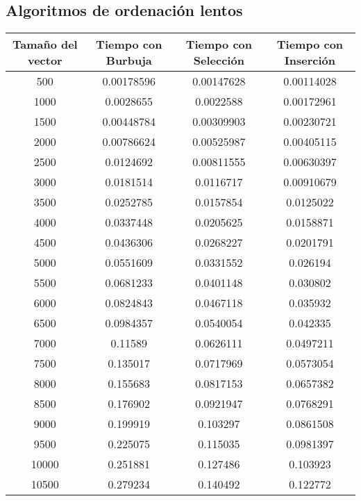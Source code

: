 \documentclass{article}
\begin{document}
	\subsection{Algoritmos de ordenación lentos}
		\begin{longtable}{|c|c|c|c|}
			\hline
			Tamaño del vector & Tiempo con Burbuja & Tiempo con Selección & Tiempo con Inserción \\ \hline
			500	   &    0.00178596	&  0.00147628  	   &  0.00114028   \\ \hline
			1000  &	    0.0028655	&  0.0022588  	   &  0.00172961   \\ \hline
			1500  &	    0.00448784	&  0.00309903  	   &  0.00230721   \\ \hline
			2000  &	    0.00786624	&  0.00525987  	   &  0.00405115   \\ \hline
			2500  &	    0.0124692	&  0.00811555  	   &  0.00630397   \\ \hline
			3000  &	    0.0181514	&  0.0116717  	   &  0.00910679   \\ \hline
			3500  &	    0.0252785	&  0.0157854  	   &  0.0125022   \\ \hline
			4000  &	    0.0337448	&  0.0205625  	   &  0.0158871   \\ \hline
			4500  &	    0.0436306	&  0.0268227  	   &  0.0201791   \\ \hline
			5000  &	    0.0551609	&  0.0331552  	   &  0.026194   \\ \hline
			5500  &	    0.0681233	&  0.0401148  	   &  0.030802   \\ \hline
			6000  &	    0.0824843	&  0.0467118  	   &  0.035932   \\ \hline
			6500  &	    0.0984357	&  0.0540054   	   &  0.042335   \\ \hline
			7000  &	    0.11589	    &  0.0626111   	   &  0.0497211   \\ \hline
			7500  &	    0.135017	&  0.0717969   	   &  0.0573054   \\ \hline
			8000  &	    0.155683	&  0.0817153   	   &  0.0657382   \\ \hline
			8500  &	    0.176902	&  0.0921947   	   &  0.0768291   \\ \hline
			9000  &	    0.199919	&  0.103297	       &  0.0861508   \\ \hline
			9500  &	    0.225075	&  0.115035	       &  0.0981397   \\ \hline
			10000  &	0.251881	&  0.127486	       &  0.103923   \\ \hline
			10500  &	0.279234	&  0.140492	       &  0.122772   \\ \hline

\end{longtable}
\end{document}
